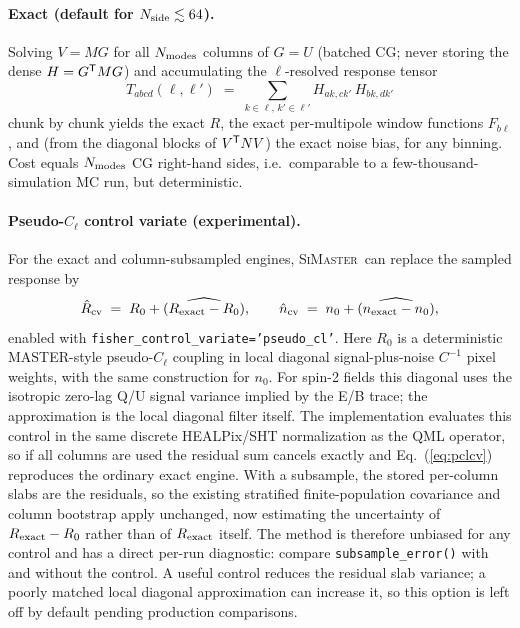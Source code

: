 \documentclass[11pt,a4paper]{article}
\newcommand{\simaster}{\textsc{SiMaster}}
\begin{document}
\paragraph{Exact (default for $N_{\rm side}\lesssim 64$).}  Solving
$V = M G$ for all $N_{\rm modes}$ columns of $G=U$ (batched CG; never
storing the dense $H = G^{\sf T} M G$) and accumulating the $\ell$-resolved
response tensor
\begin{equation}
  T_{abcd}(\ell,\ell') \;=\; \sum_{k\in\ell,\,k'\in\ell'}
  H_{ak,ck'}\,H_{bk,dk'}
\end{equation}
chunk by chunk yields the exact $R$, the exact per-multipole window
functions $F_{b\ell}$, and (from the diagonal blocks of $V^{\sf T}NV$) the
exact noise bias, for any binning.  Cost equals $N_{\rm modes}$ CG
right-hand sides, i.e.\ comparable to a few-thousand-simulation MC run, but
deterministic.

\paragraph{Pseudo-\texorpdfstring{$C_\ell$}{Cl} control variate (experimental).}
For the exact and column-subsampled engines, \simaster\ can replace the
sampled response by
\begin{equation}
  \hat R_{\rm cv} \;=\; R_0
    + \widehat{(R_{\rm exact}-R_0)},\qquad
  \hat n_{\rm cv} \;=\; n_0
    + \widehat{(n_{\rm exact}-n_0)} ,
  \label{eq:pclcv}
\end{equation}
enabled with \texttt{fisher\_control\_variate='pseudo\_cl'}.  Here $R_0$
is a deterministic MASTER-style pseudo-$C_\ell$ coupling in local diagonal
signal-plus-noise $C^{-1}$ pixel weights, with the same construction for
$n_0$.  For spin-2 fields this diagonal uses the isotropic zero-lag Q/U
signal variance implied by the E/B trace; the approximation is the local
diagonal filter itself.  The implementation evaluates this control in the
same discrete HEALPix/SHT normalization as the QML operator, so if all columns
are used the residual sum cancels exactly and Eq.~(\ref{eq:pclcv}) reproduces
the ordinary exact engine.  With a subsample, the stored per-column slabs are
the residuals, so the existing stratified finite-population covariance and
column bootstrap apply unchanged, now estimating the uncertainty of
$R_{\rm exact}-R_0$ rather than of $R_{\rm exact}$ itself.  The method is
therefore unbiased for any control and has a direct per-run diagnostic:
compare \texttt{subsample\_error()} with and without the control.  A useful
control reduces the residual slab variance; a poorly matched local diagonal
approximation can increase it, so this option is left off by default pending
production comparisons.
\end{document}
